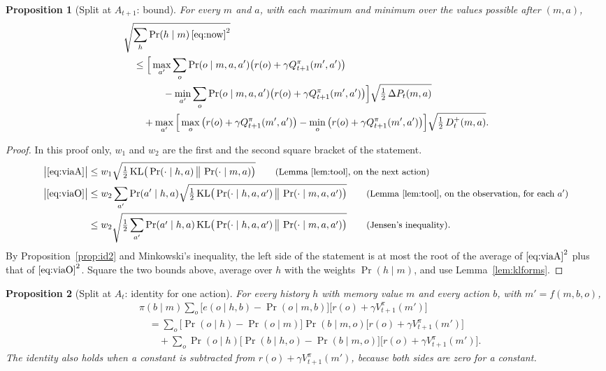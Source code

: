 \documentclass{article}
\newtheorem{proposition}{Proposition}[section]
\theoremstyle{definition}
\numberwithin{equation}{section}
\newcommand{\KL}{\mathrm{KL}}
\newcommand{\dP}{\Delta P}
\newcommand{\why}[1]{\tag*{\small(#1)}}
\begin{document}
\begin{proposition}[Split at $A_{t+1}$: bound]\label{prop:bound2}
For every $m$ and $a$, with each maximum and minimum over the values possible after $(m,a)$,
\begin{align*}
&\sqrt{\sum_h\Pr(h\mid m)\,\eqref{eq:now}^2}\\
&\quad\le\Big[\max_{a'}\sum_o\Pr(o\mid m,a,a')\big(r(o)+\gamma Q^\pi_{t+1}(m',a')\big)\\
&\qquad\qquad-\min_{a'}\sum_o\Pr(o\mid m,a,a')\big(r(o)+\gamma Q^\pi_{t+1}(m',a')\big)\Big]\sqrt{\tfrac12\,\dP_t(m,a)}\\
&\qquad+\max_{a'}\Big[\max_o\big(r(o)+\gamma Q^\pi_{t+1}(m',a')\big)-\min_o\big(r(o)+\gamma Q^\pi_{t+1}(m',a')\big)\Big]\sqrt{\tfrac12\,D^+_t(m,a)}.
\end{align*}
\end{proposition}

\begin{proof}
In this proof only, $w_1$ and $w_2$ are the first and the second square bracket of the statement.
\begin{align*}
\big|\eqref{eq:viaA}\big|&\le w_1\sqrt{\tfrac12\,\KL\big(\Pr(\cdot\mid h,a)\,\big\|\,\Pr(\cdot\mid m,a)\big)} \why{Lemma~\ref{lem:tool}, on the next action}\\
\big|\eqref{eq:viaO}\big|&\le w_2\sum_{a'}\Pr(a'\mid h,a)\sqrt{\tfrac12\,\KL\big(\Pr(\cdot\mid h,a,a')\,\big\|\,\Pr(\cdot\mid m,a,a')\big)} \why{Lemma~\ref{lem:tool}, on the observation, for each $a'$}\\
&\le w_2\sqrt{\tfrac12\sum_{a'}\Pr(a'\mid h,a)\,\KL\big(\Pr(\cdot\mid h,a,a')\,\big\|\,\Pr(\cdot\mid m,a,a')\big)} \why{Jensen's inequality}.
\end{align*}
By Proposition~\ref{prop:id2} and Minkowski's inequality, the left side of the statement is at most the root of the average of $\eqref{eq:viaA}^2$ plus that of $\eqref{eq:viaO}^2$. Square the two bounds above, average over $h$ with the weights $\Pr(h\mid m)$, and use Lemma~\ref{lem:klforms}.
\end{proof}

\begin{proposition}[Split at $A_t$: identity for one action]\label{prop:id1}
For every history $h$ with memory value $m$ and every action $b$, with $m'=f(m,b,o)$,
\begin{align*}
&\pi(b\mid m)\sum_o\big[e(o\mid h,b)-\Pr(o\mid m,b)\big]\big[r(o)+\gamma V^\pi_{t+1}(m')\big]\\
&\quad=\sum_o\big[\Pr(o\mid h)-\Pr(o\mid m)\big]\Pr(b\mid m,o)\big[r(o)+\gamma V^\pi_{t+1}(m')\big]\\
&\qquad+\sum_o\Pr(o\mid h)\big[\Pr(b\mid h,o)-\Pr(b\mid m,o)\big]\big[r(o)+\gamma V^\pi_{t+1}(m')\big].
\end{align*}
The identity also holds when a constant is subtracted from $r(o)+\gamma V^\pi_{t+1}(m')$, because both sides are zero for a constant.
\end{proposition}
\end{document}
